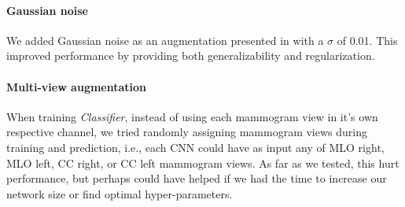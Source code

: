 \documentclass[journal]{IEEEtran}
\begin{document}
\paragraph{Gaussian noise} We added Gaussian noise as an augmentation presented in \cite{gaussian-2015} with a $\sigma$ of 0.01.  This improved performance by providing both generalizability and regularization.

\paragraph{Multi-view augmentation} When training \textit{Classifier}, instead of using each mammogram view in it's own respective channel, we tried randomly assigning mammogram views during training and prediction, i.e., each CNN could have as input any of MLO right, MLO left, CC right, or CC left mammogram views.  As far as we tested, this hurt performance, but perhaps could have helped if we had the time to increase our network size or find optimal hyper-parameters.  
\end{document}
